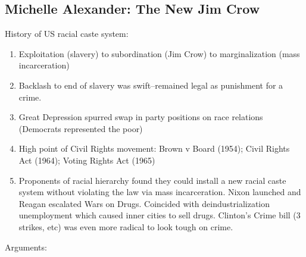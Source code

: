 \documentclass[
]{article}
\begin{document}
\hypertarget{michelle-alexander-the-new-jim-crow}{%
\subsection{Michelle Alexander: The New Jim
Crow}\label{michelle-alexander-the-new-jim-crow}}

History of US racial caste system:

\begin{enumerate}
\def\labelenumi{\arabic{enumi}.}
\item
  Exploitation (slavery) to subordination (Jim Crow) to marginalization
  (mass incarceration)
\item
  Backlash to end of slavery was swift--remained legal as punishment for
  a crime.
\item
  Great Depression spurred swap in party positions on race relations
  (Democrats represented the poor)
\item
  High point of Civil Rights movement: Brown v Board (1954); Civil
  Rights Act (1964); Voting Rights Act (1965)
\item
  Proponents of racial hierarchy found they could install a new racial
  caste system without violating the law via mass incarceration. Nixon
  launched and Reagan escalated Wars on Drugs. Coincided with
  deindustrialization unemployment which caused inner cities to sell
  drugs. Clinton's Crime bill (3 strikes, etc) was even more radical to
  look tough on crime.
\end{enumerate}

Arguments:
\end{document}
